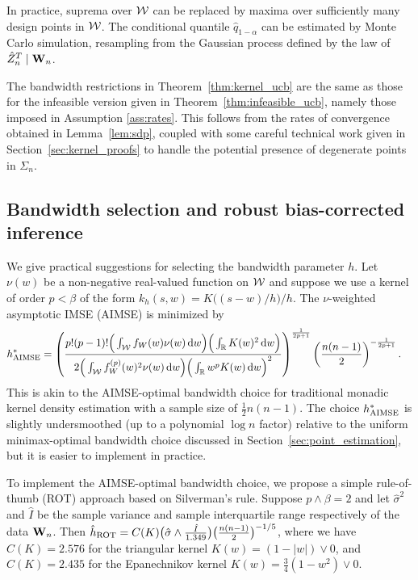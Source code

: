 In practice, suprema over $\mathcal{W}$ can be replaced by maxima over sufficiently
many design points in $\mathcal{W}$. The conditional quantile $\hat q_{1-\alpha}$ can
be estimated by Monte Carlo simulation, resampling from the Gaussian process
defined by the law of $\hat Z_n^T \mid \mathbf{W}_n$.

The bandwidth restrictions in Theorem~\ref{thm:kernel_ucb} are the same as
those for the infeasible version given in Theorem~\ref{thm:infeasible_ucb},
namely those imposed in Assumption \ref{ass:rates}. This follows from the rates
of convergence obtained in Lemma~\ref{lem:sdp}, coupled with some careful
technical work given in Section~\ref{sec:kernel_proofs} to handle the potential
presence of degenerate points in $\Sigma_n$.

\subsection{Bandwidth selection and robust bias-corrected inference}
\label{sec:bandwidth_selection}

We give practical suggestions for selecting the bandwidth parameter $h$.
Let $\nu(w)$ be a non-negative real-valued function on $\mathcal{W}$ and suppose we use
a kernel of order $p < \beta$ of the form $k_h(s,w) = K\big((s-w) / h\big)/h$.
The $\nu$-weighted asymptotic IMSE (AIMSE) is minimized by
%
\begin{align*}
  h^*_{\operatorname{AIMSE}}
  &=
  \left(
    \frac{p!(p-1)!
      \Big(\int_{\mathcal{W}} f_W(w) \nu(w) \,\mathrm{d}w\Big)
    \Big(\int_{\mathbb{R}} K(w)^2 \,\mathrm{d}w\Big)}
    {2 \Big(
        \int_{\mathcal{W}}
        f_W^{(p)}(w)^2
        \nu(w)
        \,\mathrm{d}w
      \Big)
      \Big(
        \int_{\mathbb{R}}
        w^p K(w)
        \,\mathrm{d}w
      \Big)^2
    }
  \right)^{\frac{1}{2p+1}}
  \left( \frac{n(n-1)}{2} \right)^{-\frac{1}{2p+1}}.
\end{align*}
%
This is akin to the AIMSE-optimal bandwidth choice for traditional monadic
kernel density estimation with a sample size of $\frac{1}{2}n(n-1)$. The choice
$h^*_{\operatorname{AIMSE}}$ is slightly undersmoothed (up to a polynomial $\log n$ factor)
relative to the uniform minimax-optimal bandwidth choice discussed in
Section~\ref{sec:point_estimation}, but it is easier to implement in practice.

To implement the AIMSE-optimal bandwidth choice, we propose a simple
rule-of-thumb (ROT) approach based on Silverman's rule.
Suppose $p\wedge\beta=2$ and let $\hat\sigma^2$ and $\hat I$
be the sample variance and sample interquartile range respectively
of the data $\mathbf{W}_n$. Then
$\hat{h}_{\operatorname{ROT}} = C(K) \big( \hat\sigma \wedge
\frac{\hat I}{1.349} \big) \big(\frac{n(n-1)}{2} \big)^{-1/5}$,
where we have $C(K)=2.576$ for the triangular kernel $K(w) = (1 - |w|) \vee 0$,
and $C(K)=2.435$ for the Epanechnikov kernel
$K(w) = \frac{3}{4}(1 - w^2) \vee 0$.

